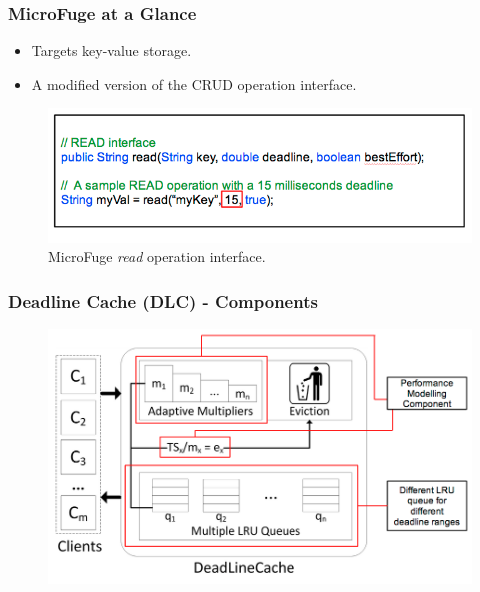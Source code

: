 \documentclass{beamer}
\newcommand{\myv}{\vspace{3 mm}}
\begin{document}
\begin{frame}
  \frametitle{MicroFuge at a Glance}
  \begin{itemize}
  \item Targets key-value storage.
    \myv
  \item A modified version of the CRUD operation interface.
  \end{itemize}
  \begin{figure}
  \includegraphics[scale=0.40]{img/MicroFuge_protocol.png}

  \caption{MicroFuge \textit{read} operation interface.}
  \end{figure}
\end{frame}

\begin{frame}
  \frametitle{Deadline Cache (DLC) - Components}
  \begin{figure}
    \begin{center}
      \centerline{\includegraphics[scale=0.38]{img/DLC.png}}
    \end{center}
  \end{figure}
\end{frame}
\end{document}
